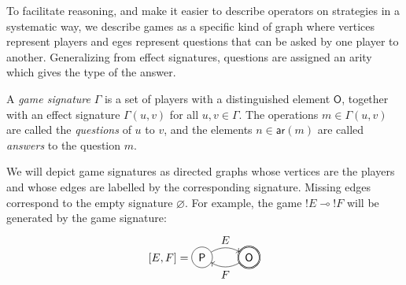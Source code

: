 \documentclass[format=sigplan,authordraft]{acmart}
\newcommand{\kw}[1]{\ensuremath{ \mathsf{#1} }}
\begin{document}
To facilitate reasoning,
and make it easier to describe operators on strategies
in a systematic way,
we describe games as a specific kind of graph
where vertices represent players
and eges represent questions that can be asked
by one player to another.
Generalizing from effect signatures,
questions are assigned an arity
which gives the type of the answer.

\begin{definition}
A \emph{game signature} $\Gamma$
is a set of players with a distinguished element $\kw{O}$,
together with an effect signature $\Gamma(u, v)$
for all $u, v \in \Gamma$.
The operations $m \in \Gamma(u, v)$ are called
the \emph{questions} of $u$ to $v$,
and the elements $n \in \kw{ar}(m)$ are called
\emph{answers} to the question $m$.
\end{definition}

We will depict game signatures as directed graphs
whose vertices are the players and
whose edges are labelled by the corresponding signature.
Missing edges correspond to the empty signature $\varnothing$.
For example,
the game ${!E} \multimap {!F}$ will be generated by
the game signature:
\[
  [E,F] =
  \begin{tikzpicture}[baseline=(O.base),scale=1.5]
    \node[circle,draw,double] (O) at (0,0) {$\kw{O}$};
    \node[circle,draw] (P) at (-1,0) {$\kw{P}$};
    \path[->] (P) edge[bend left] node[above] {$E$} (O);
    \path[->] (O) edge[bend left] node[below] {$F$} (P);
  \end{tikzpicture}
\]
\end{document}
